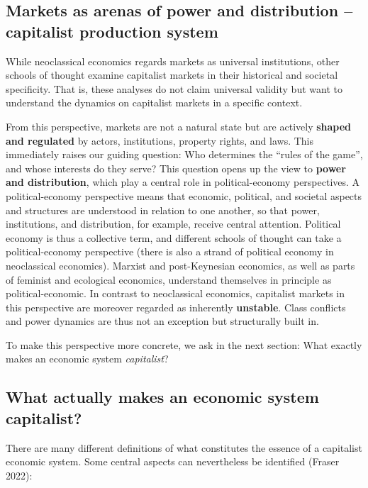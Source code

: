 \documentclass[
  british,
  a4paper,
  DIV=11,
  numbers=noendperiod,
  oneside,
  openany]{scrreprt}
\begin{document}
\subsection{Markets as arenas of power and distribution -- capitalist
production
system}\label{markets-as-arenas-of-power-and-distribution-capitalist-production-system}

While neoclassical economics regards markets as universal institutions,
other schools of thought examine capitalist markets in their historical
and societal specificity. That is, these analyses do not claim universal
validity but want to understand the dynamics on capitalist markets in a
specific context.

From this perspective, markets are not a natural state but are actively
\textbf{shaped and regulated} by actors, institutions, property rights,
and laws. This immediately raises our guiding question: Who determines
the ``rules of the game'', and whose interests do they serve? This
question opens up the view to \textbf{power and distribution}, which
play a central role in political-economy perspectives. A
political-economy perspective means that economic, political, and
societal aspects and structures are understood in relation to one
another, so that power, institutions, and distribution, for example,
receive central attention. Political economy is thus a collective term,
and different schools of thought can take a political-economy
perspective (there is also a strand of political economy in neoclassical
economics). Marxist and post-Keynesian economics, as well as parts of
feminist and ecological economics, understand themselves in principle as
political-economic. In contrast to neoclassical economics, capitalist
markets in this perspective are moreover regarded as inherently
\textbf{unstable}. Class conflicts and power dynamics are thus not an
exception but structurally built in.

To make this perspective more concrete, we ask in the next section: What
exactly makes an economic system \emph{capitalist}?

\subsection{What actually makes an economic system
capitalist?}\label{what-actually-makes-an-economic-system-capitalist}

There are many different definitions of what constitutes the essence of
a capitalist economic system. Some central aspects can nevertheless be
identified (Fraser 2022):
\end{document}
